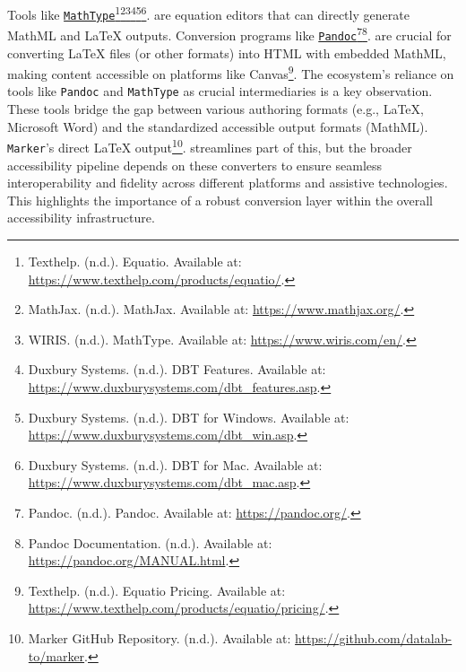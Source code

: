Tools like \href{https://www.wiris.com/en/}{\texttt{MathType}}\footnote{Texthelp. (n.d.). Equatio. Available at: \url{https://www.texthelp.com/products/equatio/}.}\footnote{MathJax. (n.d.). MathJax. Available at: \url{https://www.mathjax.org/}.}\footnote{WIRIS. (n.d.). MathType. Available at: \url{https://www.wiris.com/en/}.}\footnote{Duxbury Systems. (n.d.). DBT Features. Available at: \url{https://www.duxburysystems.com/dbt_features.asp}.}\footnote{Duxbury Systems. (n.d.). DBT for Windows. Available at: \url{https://www.duxburysystems.com/dbt_win.asp}.}\footnote{Duxbury Systems. (n.d.). DBT for Mac. Available at: \url{https://www.duxburysystems.com/dbt_mac.asp}.}. are equation editors that can directly generate MathML and LaTeX outputs. Conversion programs like \href{https://pandoc.org/}{\texttt{Pandoc}}\footnote{Pandoc. (n.d.). Pandoc. Available at: \url{https://pandoc.org/}.}\footnote{Pandoc Documentation. (n.d.). Available at: \url{https://pandoc.org/MANUAL.html}.}. are crucial for converting LaTeX files (or other formats) into HTML with embedded MathML, making content accessible on platforms like Canvas\footnote{Texthelp. (n.d.). Equatio Pricing. Available at: \url{https://www.texthelp.com/products/equatio/pricing/}.}. The ecosystem's reliance on tools like \texttt{Pandoc} and \texttt{MathType} as crucial intermediaries is a key observation. These tools bridge the gap between various authoring formats (e.g., LaTeX, Microsoft Word) and the standardized accessible output formats (MathML). \texttt{Marker}'s direct LaTeX output\footnote{Marker GitHub Repository. (n.d.). Available at: \url{https://github.com/datalab-to/marker}.}. streamlines part of this, but the broader accessibility pipeline depends on these converters to ensure seamless interoperability and fidelity across different platforms and assistive technologies. This highlights the importance of a robust conversion layer within the overall accessibility infrastructure.

